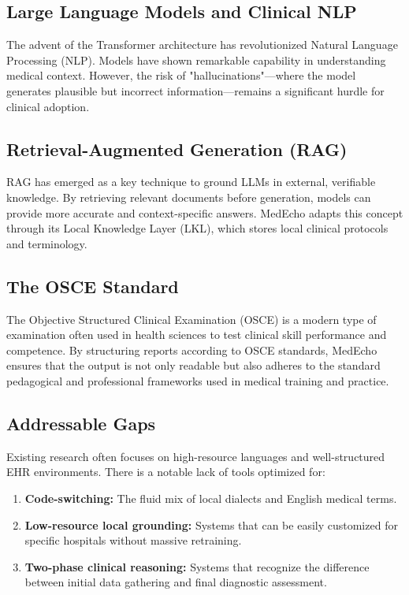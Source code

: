 \documentclass[12pt,a4paper]{article}
\begin{document}
\subsection{Large Language Models and Clinical NLP}
The advent of the Transformer architecture has revolutionized Natural Language Processing (NLP). Models have shown remarkable capability in understanding medical context. However, the risk of "hallucinations"—where the model generates plausible but incorrect information—remains a significant hurdle for clinical adoption.

\subsection{Retrieval-Augmented Generation (RAG)}
RAG has emerged as a key technique to ground LLMs in external, verifiable knowledge. By retrieving relevant documents before generation, models can provide more accurate and context-specific answers. MedEcho adapts this concept through its Local Knowledge Layer (LKL), which stores local clinical protocols and terminology.

\subsection{The OSCE Standard}
The Objective Structured Clinical Examination (OSCE) is a modern type of examination often used in health sciences to test clinical skill performance and competence. By structuring reports according to OSCE standards, MedEcho ensures that the output is not only readable but also adheres to the standard pedagogical and professional frameworks used in medical training and practice.

\subsection{Addressable Gaps}
Existing research often focuses on high-resource languages and well-structured EHR environments. There is a notable lack of tools optimized for:
\begin{enumerate}
    \item \textbf{Code-switching:} The fluid mix of local dialects and English medical terms.
    \item \textbf{Low-resource local grounding:} Systems that can be easily customized for specific hospitals without massive retraining.
    \item \textbf{Two-phase clinical reasoning:} Systems that recognize the difference between initial data gathering and final diagnostic assessment.
\end{enumerate}
\end{document}
